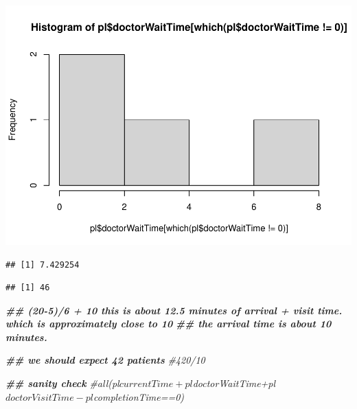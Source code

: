 \documentclass[
]{book}
\newenvironment{Shaded}{\begin{snugshade}}{\end{snugshade}}
\newcommand{\CommentTok}[1]{\textcolor[rgb]{0.56,0.35,0.01}{\textit{#1}}}
\newcommand{\DecValTok}[1]{\textcolor[rgb]{0.00,0.00,0.81}{#1}}
\newcommand{\DocumentationTok}[1]{\textcolor[rgb]{0.56,0.35,0.01}{\textbf{\textit{#1}}}}
\newcommand{\FunctionTok}[1]{\textcolor[rgb]{0.00,0.00,0.00}{#1}}
\newcommand{\NormalTok}[1]{#1}
\newcommand{\SpecialCharTok}[1]{\textcolor[rgb]{0.00,0.00,0.00}{#1}}
\theoremstyle{definition}
\theoremstyle{definition}
\theoremstyle{definition}
\theoremstyle{definition}
\theoremstyle{remark}
\begin{document}
\includegraphics{_main_files/figure-latex/unnamed-chunk-9-3.pdf}

\begin{Shaded}
\end{Shaded}

\begin{verbatim}
## [1] 7.429254
\end{verbatim}

\begin{Shaded}
\end{Shaded}

\begin{verbatim}
## [1] 46
\end{verbatim}

\begin{Shaded}
\begin{Highlighting}[]
\DocumentationTok{\#\# (20{-}5)/6 + 10 this is about 12.5 minutes of arrival + visit time. which is approximately close to 10 }
\DocumentationTok{\#\# the arrival time is about 10 minutes.  }

\DocumentationTok{\#\# we should expect 42 patients}
 \CommentTok{\#420/10}
  
  \DocumentationTok{\#\# sanity check}
  \CommentTok{\#all(pl$currentTime+pl$doctorWaitTime+pl$doctorVisitTime{-}pl$completionTime==0)}
\end{Highlighting}
\end{Shaded}
\end{document}
